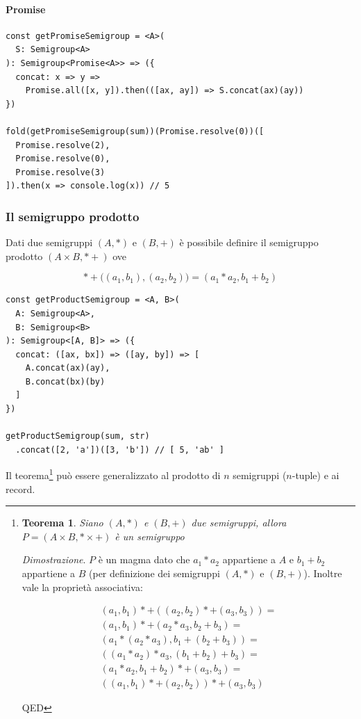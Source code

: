 \documentclass[12pt]{article}
\newtheorem{theorem}{Teorema}
\begin{document}
\paragraph{Promise}

\begin{verbatim}
const getPromiseSemigroup = <A>(
  S: Semigroup<A>
): Semigroup<Promise<A>> => ({
  concat: x => y =>
    Promise.all([x, y]).then(([ax, ay]) => S.concat(ax)(ay))
})

fold(getPromiseSemigroup(sum))(Promise.resolve(0))([
  Promise.resolve(2),
  Promise.resolve(0),
  Promise.resolve(3)
]).then(x => console.log(x)) // 5
\end{verbatim}

\subsubsection{Il semigruppo prodotto}

Dati due semigruppi $(A, *)$ e $(B, +)$ è possibile definire il semigruppo prodotto $(A \times B, *+)$ ove

$$
*+\Big((a_1, b_1), (a_2, b_2)\Big) = (a_1 * a_2, b_1 + b_2)
$$

\begin{verbatim}
const getProductSemigroup = <A, B>(
  A: Semigroup<A>,
  B: Semigroup<B>
): Semigroup<[A, B]> => ({
  concat: ([ax, bx]) => ([ay, by]) => [
    A.concat(ax)(ay),
    B.concat(bx)(by)
  ]
})

getProductSemigroup(sum, str)
  .concat([2, 'a'])([3, 'b']) // [ 5, 'ab' ]
\end{verbatim}

Il teorema\footnote{
\begin{theorem}
Siano $(A, *)$ e $(B, +)$ due semigruppi, allora $P = (A \times B, * \times +)$ è un semigruppo
\end{theorem}

\emph{Dimostrazione}. $P$ è un magma dato che $a_1 * a_2$ appartiene a $A$ e $b_1 + b_2$ appartiene a $B$ (per definizione dei semigruppi $(A, *)$ e $(B, +)$).
Inoltre vale la proprietà associativa:

\begin{eqnarray}
(a_1, b_1) *+ ((a_2, b_2) *+ (a_3, b_3)) = \\
(a_1, b_1) *+ (a_2 * a_3, b_2 + b_3) = \\
(a_1 * (a_2 * a_3), b_1 + (b_2 + b_3)) = \\
((a_1 * a_2) * a_3, (b_1 + b_2) + b_3) = \\
(a_1 * a_2, b_1 + b_2) *+ (a_3, b_3) = \\
((a_1, b_1) *+ (a_2, b_2)) *+ (a_3, b_3)
\end{eqnarray}

QED

} può essere generalizzato al prodotto di $n$ semigruppi ($n$-tuple) e ai record.
\end{document}
